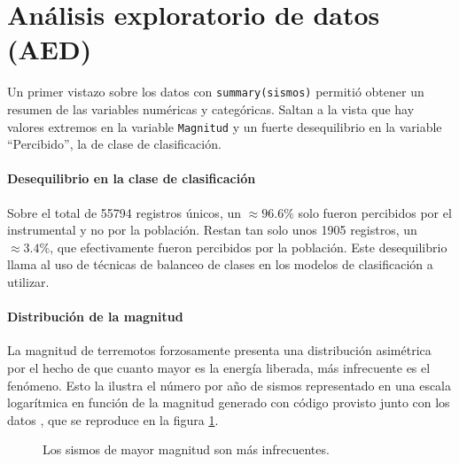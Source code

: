 \documentclass[a4paper]{report}
\begin{document}
\section{Análisis exploratorio de datos (AED)}\label{sec:AED}

Un primer vistazo sobre los datos con \verb'summary(sismos)' permitió obtener un resumen de las variables numéricas y categóricas.
Saltan a la vista que hay valores extremos en la variable \verb'Magnitud' y un fuerte desequilibrio en la variable ``Percibido'', la de clase de clasificación.


\paragraph{Desequilibrio en la clase de clasificación}
Sobre el total de 55794 registros únicos, un \(\approx 96.6\%\) solo fueron percibidos por el instrumental y no por la población.
Restan tan solo unos 1905 registros, un \(\approx 3.4\%\), que efectivamente fueron percibidos por la población.
Este desequilibrio llama al uso de técnicas de balanceo de clases en los modelos de clasificación a utilizar.


\paragraph{Distribución de la magnitud}
La magnitud de terremotos forzosamente presenta una distribución asimétrica por el hecho de que cuanto mayor es la energía liberada, más infrecuente es el fenómeno.
Esto la ilustra el número por año de sismos representado en una escala logarítmica en función de la magnitud generado con código provisto junto con los datos \cite[sección 4.2.1]{daniela_parada_ic-datasets-docencia_nodate}, que se reproduce en la figura \ref{fig:acumulado_anual_magnitud}.


\begin{figure}[!ht]
\centering

\caption{Los sismos de mayor magnitud son más infrecuentes.}
\label{fig:acumulado_anual_magnitud}
\end{figure}
\end{document}
